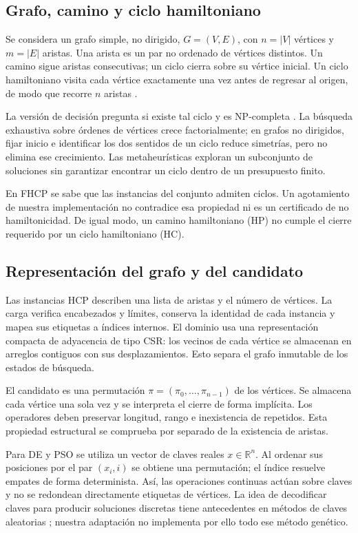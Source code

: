 \subsection{Grafo, camino y ciclo hamiltoniano}
Se considera un grafo simple, no dirigido, $G=(V,E)$, con $n=|V|$ vértices y $m=|E|$ aristas. Una arista es un par no ordenado de vértices distintos. Un camino sigue aristas consecutivas; un ciclo cierra sobre su vértice inicial. Un ciclo hamiltoniano visita cada vértice exactamente una vez antes de regresar al origen, de modo que recorre $n$ aristas \citep{diestel2025GraphTheory6}.

La versión de decisión pregunta si existe tal ciclo y es NP-completa \citep{karp1972Reducibility}. La búsqueda exhaustiva sobre órdenes de vértices crece factorialmente; en grafos no dirigidos, fijar inicio e identificar los dos sentidos de un ciclo reduce simetrías, pero no elimina ese crecimiento. Las metaheurísticas exploran un subconjunto de soluciones sin garantizar encontrar un ciclo dentro de un presupuesto finito.

En FHCP se sabe que las instancias del conjunto admiten ciclos. Un agotamiento de nuestra implementación no contradice esa propiedad ni es un certificado de no hamiltonicidad. De igual modo, un camino hamiltoniano (HP) no cumple el cierre requerido por un ciclo hamiltoniano (HC).

\subsection{Representación del grafo y del candidato}
Las instancias HCP describen una lista de aristas y el número de vértices. La carga verifica encabezados y límites, conserva la identidad de cada instancia y mapea sus etiquetas a índices internos. El dominio usa una representación compacta de adyacencia de tipo CSR: los vecinos de cada vértice se almacenan en arreglos contiguos con sus desplazamientos. Esto separa el grafo inmutable de los estados de búsqueda.

El candidato es una permutación $\pi=(\pi_0,\ldots,\pi_{n-1})$ de los vértices. Se almacena cada vértice una sola vez y se interpreta el cierre de forma implícita. Los operadores deben preservar longitud, rango e inexistencia de repetidos. Esta propiedad estructural se comprueba por separado de la existencia de aristas.

Para DE y PSO se utiliza un vector de claves reales $x\in\mathbb{R}^n$. Al ordenar sus posiciones por el par $(x_i,i)$ se obtiene una permutación; el índice resuelve empates de forma determinista. Así, las operaciones continuas actúan sobre claves y no se redondean directamente etiquetas de vértices. La idea de decodificar claves para producir soluciones discretas tiene antecedentes en métodos de claves aleatorias \citep{goncalvesResende2009RandomKeys}; nuestra adaptación no implementa por ello todo ese método genético.

